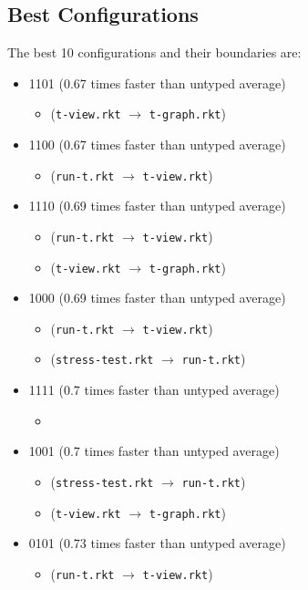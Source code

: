 \documentclass{article}
\newcommand{\mono}[1]{\texttt{#1}}
\begin{document}
\subsection{Best Configurations}
The best 10 configurations and their boundaries are:
\begin{itemize}
\item 1101 (0.67 times faster than untyped average)
  \begin{itemize}
  \item (\mono{t-view.rkt} $\rightarrow$ \mono{t-graph.rkt})
  \end{itemize}
\item 1100 (0.67 times faster than untyped average)
  \begin{itemize}
  \item (\mono{run-t.rkt} $\rightarrow$ \mono{t-view.rkt})
  \end{itemize}
\item 1110 (0.69 times faster than untyped average)
  \begin{itemize}
  \item (\mono{run-t.rkt} $\rightarrow$ \mono{t-view.rkt})
  \item (\mono{t-view.rkt} $\rightarrow$ \mono{t-graph.rkt})
  \end{itemize}
\item 1000 (0.69 times faster than untyped average)
  \begin{itemize}
  \item (\mono{run-t.rkt} $\rightarrow$ \mono{t-view.rkt})
  \item (\mono{stress-test.rkt} $\rightarrow$ \mono{run-t.rkt})
  \end{itemize}
\item 1111 (0.7 times faster than untyped average)
  \begin{itemize}
  \item 
  \end{itemize}
\item 1001 (0.7 times faster than untyped average)
  \begin{itemize}
  \item (\mono{stress-test.rkt} $\rightarrow$ \mono{run-t.rkt})
  \item (\mono{t-view.rkt} $\rightarrow$ \mono{t-graph.rkt})
  \end{itemize}
\item 0101 (0.73 times faster than untyped average)
  \begin{itemize}
  \item (\mono{run-t.rkt} $\rightarrow$ \mono{t-view.rkt})

\end{itemize}
\end{itemize}
\end{document}
